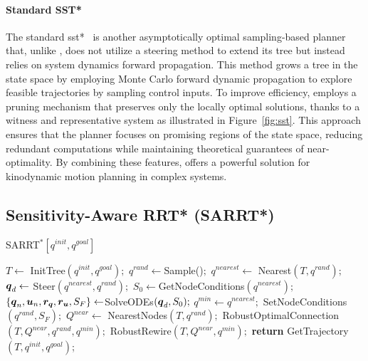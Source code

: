 \paragraph{Standard SST*}

The standard \gls{sst*}~\cite{cSST} is another asymptotically optimal sampling-based planner that, unlike , does not utilize a steering method to extend its tree but instead relies on system dynamics forward propagation.
This method grows a tree in the state space by employing Monte Carlo forward dynamic propagation to explore feasible trajectories by sampling control inputs.
To improve efficiency,  employs a pruning mechanism that preserves only the locally optimal solutions, thanks to a witness and representative system as illustrated in Figure~\ref{fig:sst}.
This approach ensures that the planner focuses on promising regions of the state space, reducing redundant computations while maintaining theoretical guarantees of near-optimality. 
By combining these features,  offers a powerful solution for kinodynamic motion planning in complex systems.

\subsection{Sensitivity-Aware RRT* (SARRT*)}\label{sec:sarrt*}

\begin{algorithm}[h!]
    \caption{SARRT$^* [q^{init}, q^{goal}]$}\label{alg:SARRT*}
    \begin{algorithmic}[1]
        \State $T \gets$ InitTree$({q^{init}, q^{goal}});$
            \State $q^{rand} \gets $Sample()$;$
            \State $q^{nearest} \gets$ Nearest$(T,{q^{rand}});$
            \State $\boldsymbol{q}_d \gets$ Steer$({q^{nearest}},{q^{rand}});$
            \State $S_0 \gets $GetNodeConditions$({q^{nearest}});$
            \State $\left \{\boldsymbol{q}_n, \boldsymbol{u}_n, \boldsymbol{r_q}, \boldsymbol{r_u}, S_F \right \}  \gets $SolveODEs$(\boldsymbol{q}_d, S_0);$
                \State $q^{min} \gets q^{nearest};$
                \State SetNodeConditions$({q^{rand}}, S_{F});$
                \State $Q^{near} \gets$ NearestNodes$(T,{q^{rand}});$
                \State RobustOptimalConnection$(T, Q^{near}, q^{rand}, q^{min});$
                \State RobustRewire$(T, Q^{near}, q^{min});$
            \EndIf
        \EndWhile
        \State \textbf{return} GetTrajectory$(T, q^{init}, q^{goal})$;
    \end{algorithmic}
\end{algorithm}

